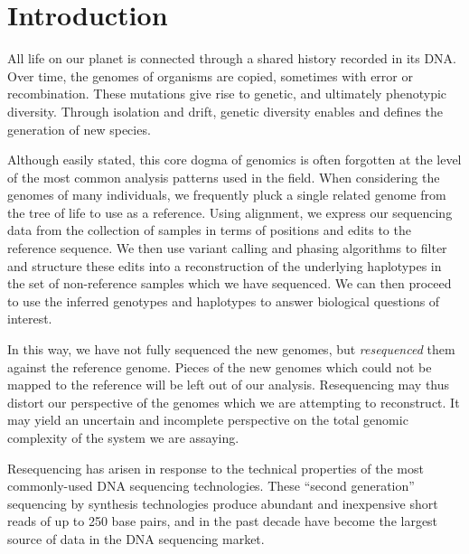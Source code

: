 
\chapter{Introduction}  %

\ifpdf
    \graphicspath{{Chapter1/Figs/Raster/}{Chapter1/Figs/PDF/}{Chapter1/Figs/}}
\else
    \graphicspath{{Chapter1/Figs/Vector/}{Chapter1/Figs/}}
\fi


All life on our planet is connected through a shared history recorded in its DNA.
Over time, the genomes of organisms are copied, sometimes with error or recombination.
These mutations give rise to genetic, and ultimately phenotypic diversity.
Through isolation and drift, genetic diversity enables and defines the generation of new species.

Although easily stated, this core dogma of genomics is often forgotten at the level of the most common analysis patterns used in the field.
When considering the genomes of many individuals, we frequently pluck a single related genome from the tree of life to use as a reference.
Using alignment, we express our sequencing data from the collection of samples in terms of positions and edits to the reference sequence.
We then use variant calling and phasing algorithms to filter and structure these edits into a reconstruction of the underlying haplotypes in the set of non-reference samples which we have sequenced.
We can then proceed to use the inferred genotypes and haplotypes to answer biological questions of interest.

In this way, we have not fully sequenced the new genomes, but \emph{resequenced} them against the reference genome.
Pieces of the new genomes which could not be mapped to the reference will be left out of our analysis.
Resequencing may thus distort our perspective of the genomes which we are attempting to reconstruct.
It may yield an uncertain and incomplete perspective on the total genomic complexity of the system we are assaying.

Resequencing has arisen in response to the technical properties of the most commonly-used DNA sequencing technologies.
These ``second generation'' sequencing by synthesis technologies produce abundant and inexpensive short reads of up to 250 base pairs, and in the past decade have become the largest source of data in the DNA sequencing market.

